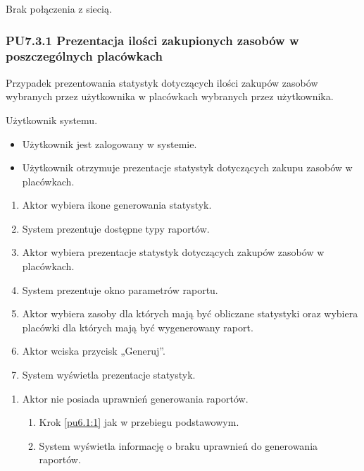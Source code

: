 Brak połączenia z siecią.

\subsubsection{PU7.3.1 Prezentacja ilości zakupionych zasobów w poszczególnych placówkach}
Przypadek prezentowania statystyk dotyczących ilości zakupów zasobów wybranych przez użytkownika w placówkach wybranych przez użytkownika.

Użytkownik systemu.

\begin{itemize}
\item Użytkownik jest zalogowany w systemie.
\end{itemize}

\begin{itemize}
\item Użytkownik otrzymuje prezentacje statystyk dotyczących zakupu zasobów w placówkach.
\end{itemize}

\begin{enumerate}
	\item \label{pu7.3.1:1} Aktor wybiera ikone generowania statystyk.
	\item System prezentuje dostępne typy raportów.
	\item \label{pu7.3.1:2} Aktor wybiera prezentacje statystyk dotyczących zakupów zasobów w placówkach.
	\item System prezentuje okno parametrów raportu.
	\item Aktor wybiera zasoby dla których mają być obliczane statystyki oraz wybiera placówki dla których mają być wygenerowany raport.
	\item Aktor wciska przycisk „Generuj”.
	\item System wyświetla prezentacje statystyk.
\end{enumerate}

\begin{enumerate}
	\item Aktor nie posiada uprawnień generowania raportów.
	\begin{enumerate}[label*=\arabic*.]
		\item Krok \ref{pu6.1:1} jak w przebiegu podstawowym.
		\item System wyświetla informację o braku uprawnień do generowania raportów.
	\end{enumerate}
\end{enumerate}

